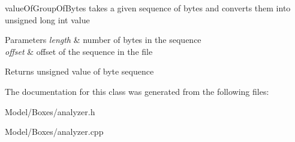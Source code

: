 value\-Of\-Group\-Of\-Bytes takes a given sequence of bytes and converts them into unsigned long int value 


\begin{DoxyParams}{Parameters}
{\em length} & number of bytes in the sequence \\
\hline
{\em offset} & offset of the sequence in the file \\
\hline
\end{DoxyParams}
\begin{DoxyReturn}{Returns}
unsigned value of byte sequence 
\end{DoxyReturn}


The documentation for this class was generated from the following files\-:\begin{DoxyCompactItemize}
\item 
Model/\-Boxes/analyzer.\-h\item 
Model/\-Boxes/analyzer.\-cpp\end{DoxyCompactItemize}
